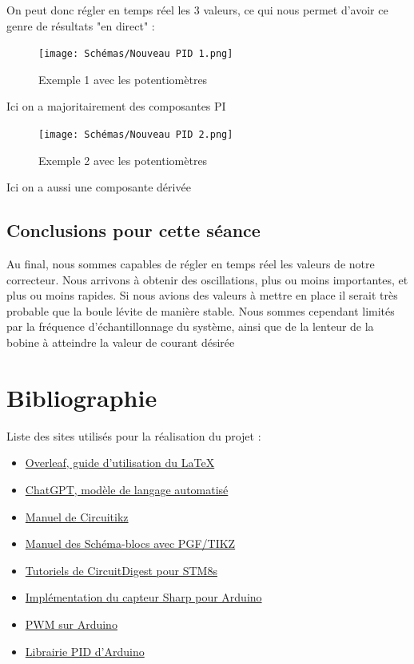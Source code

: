 \documentclass[11pt,a4paper]{article}
\begin{document}
On peut donc régler en temps réel les 3 valeurs, ce qui nous permet d'avoir ce genre de résultats "en direct" :
\begin{figure} [H]
\begin{center}
\texttt{[image: Schémas/Nouveau PID 1.png]} 
\end{center}
\caption{Exemple 1 avec les potentiomètres}
\end{figure}
Ici on a majoritairement des composantes PI

\begin{figure} [H]
\begin{center}
\texttt{[image: Schémas/Nouveau PID 2.png]} 
\end{center}
\caption{Exemple 2 avec les potentiomètres}
\end{figure}
Ici on a aussi une composante dérivée

\subsection{Conclusions pour cette séance}
Au final, nous sommes capables de régler en temps réel les valeurs de notre correcteur. Nous arrivons à obtenir des oscillations, plus ou moins importantes, et plus ou moins rapides. Si nous avions des valeurs à mettre en place il serait très probable que la boule lévite de manière stable. Nous sommes cependant limités par la fréquence d'échantillonnage du système, ainsi que de la lenteur de la bobine à atteindre la valeur de courant désirée

\pagebreak
\section{Bibliographie}
Liste des sites utilisés pour la réalisation du projet :
\begin{itemize}
\item \href{https://www.overleaf.com/learn}{Overleaf, guide d'utilisation du \LaTeX{}}
\item \href{https://chat.openai.com/chat}{ChatGPT, modèle de langage automatisé}
\item \href{https://ctan.mines-albi.fr/graphics/pgf/contrib/circuitikz/doc/circuitikzmanual.pdf}{Manuel de Circuitikz}
\item \href{https://sciences-indus-cpge.papanicola.info/IMG/pdf/schemabloc.pdf}{Manuel des Schéma-blocs avec PGF/TIKZ}
\item \href{https://circuitdigest.com/microcontroller-projects/getting-started-with-stm8s-using-stvd-and-cosmic-c-compiler}{Tutoriels de CircuitDigest pour STM8s}
\item \href{https://www.instructables.com/How-to-Use-the-Sharp-IR-Sensor-GP2Y0A41SK0F-Arduin/}{Implémentation du capteur Sharp pour Arduino}
\item \href{https://passionelectronique.fr/pwm-arduino/}{PWM sur Arduino}
\item \href{https://playground.arduino.cc/Code/PIDLibrary/}{Librairie PID d'Arduino}
\end{itemize}
\end{document}
